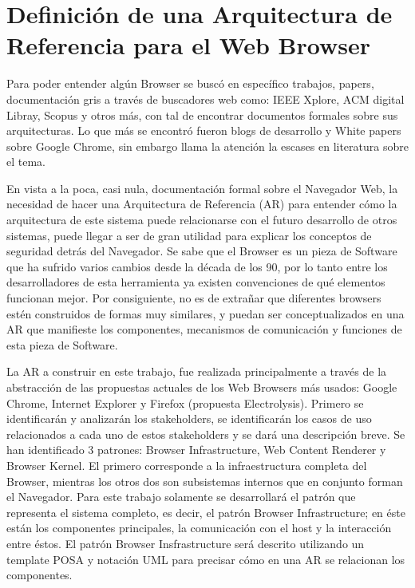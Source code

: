 \chapter{Definición de una Arquitectura de Referencia para el Web Browser}
\label{chap5:ArqRefWB}


Para poder entender algún Browser se buscó en específico trabajos, papers, documentación gris a través de buscadores web como: IEEE Xplore, ACM digital Libray, Scopus y otros más, con tal de encontrar documentos formales sobre sus arquitecturas. Lo que más se encontró fueron blogs de desarrollo y White papers sobre Google Chrome, sin embargo llama la atención la escases en literatura sobre el tema. 


En vista a la poca, casi nula, documentación formal sobre el Navegador Web, la necesidad de hacer una Arquitectura de Referencia (AR) para entender cómo la arquitectura de este sistema puede relacionarse con el futuro desarrollo de otros sistemas, puede llegar a ser de gran utilidad para explicar los conceptos de seguridad detrás del Navegador. Se sabe que el Browser es un pieza de Software que ha sufrido varios cambios desde la década de los 90, por lo tanto entre los desarrolladores de esta herramienta ya existen convenciones de qué elementos funcionan mejor. Por consiguiente, no es de extrañar que diferentes browsers estén construidos de formas muy similares, y puedan ser conceptualizados en una AR que manifieste los componentes, mecanismos de comunicación y funciones de esta pieza de Software. 


La AR a construir en este trabajo, fue realizada principalmente a través de la abstracción de las propuestas actuales de los Web Browsers más usados: Google Chrome, Internet Explorer y Firefox (propuesta Electrolysis). Primero se identificarán y analizarán los stakeholders, se identificarán los casos de uso relacionados a cada uno de estos stakeholders y se dará una descripción breve. Se han identificado 3 patrones: Browser Infrastructure, Web Content Renderer y Browser Kernel. El primero corresponde a la infraestructura completa del Browser, mientras los otros dos son subsistemas internos que en conjunto forman el Navegador. Para este trabajo solamente se desarrollará el patrón que representa el sistema completo, es decir, el patrón Browser Infrastructure; en éste están los componentes principales, la comunicación con el host y la interacción entre éstos. El patrón Browser Insfrastructure será descrito utilizando un template POSA \cite{buschman1996system} y notación UML para precisar cómo en una AR se relacionan los componentes. 

